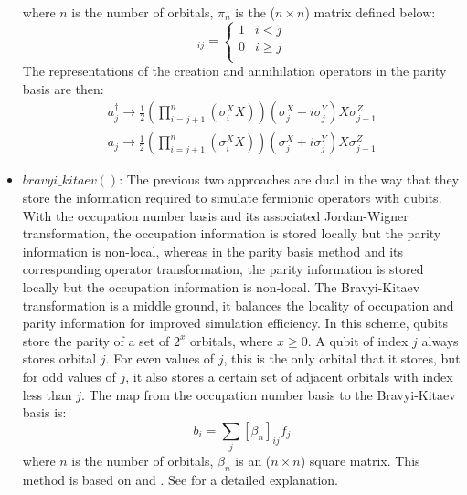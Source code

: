 \begin{itemize}
\begin{equation}
    \end{equation}
    where $n$ is the number of orbitals, $\pi_n$ is the ($n \times n$) matrix defined below: 
    \begin{equation}
        [\pi_n]_{ij} = 
        \begin{cases} 
            1 & i<j \\
            0 & i\geq j \\ 
        \end{cases}
    \end{equation}
     The representations of the creation and annihilation operators in the parity basis are then: 
    \begin{equation}
        \begin{split}
        a_j^{\dagger} \to \frac{1}{2} (\prod_{i=j+1}^n ({\sigma}^X_i X))({\sigma}^X_j - i{\sigma}^Y_j) X {\sigma}^Z_{j-1} \\
        a_j \to \frac{1}{2} (\prod_{i=j+1}^n ({\sigma}^X_i X))({\sigma}^X_j + i{\sigma}^Y_j) X {\sigma}^Z_{j-1}
        \end{split}
    \end{equation}
    \item $bravyi\_kitaev()$: The previous two approaches are dual in the way that they store the information required to simulate fermionic operators with qubits. With the occupation number basis and its associated Jordan-Wigner transformation, the occupation information is stored locally but the parity information is non-local, whereas in the parity basis method and its corresponding operator transformation, the parity information is stored locally but the occupation information is non-local. 
    The Bravyi-Kitaev transformation is a middle ground, it balances the locality of occupation and parity information for improved simulation efficiency. In this scheme, qubits store the parity of a set of $2^x$ orbitals, where $x \geq 0$. A qubit of index $j$ always stores orbital $j$. For even values of $j$, this is the only orbital that it stores, but for odd values of $j$, it also stores a certain set of adjacent orbitals with index less than $j$. The map from the occupation number basis to the Bravyi-Kitaev basis is:
    \begin{equation}
        b_i = \sum_j {[\beta_n]_{ij} f_j}
    \end{equation}
    where $n$ is the number of orbitals, $\beta_n$ is an ($n \times n$) square matrix. This method is based on \cite{bravyi2002fermionic} and \cite{fenwick1994new}. See \cite{seeley2012bravyi} for a detailed explanation. 

\end{itemize}
